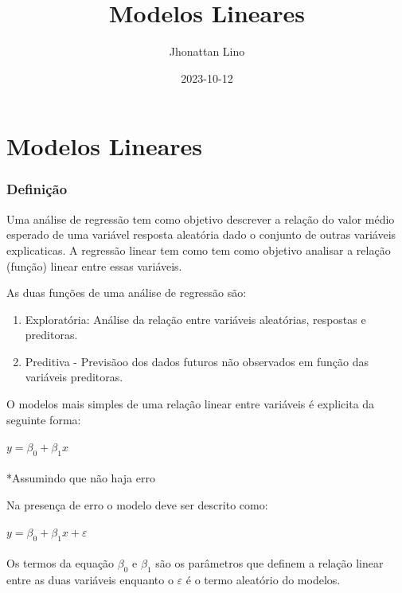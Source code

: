 \documentclass[
]{article}
\title{Modelos Lineares}
\author{Jhonattan Lino}
\date{2023-10-12}
\begin{document}
\maketitle

\hypertarget{modelos-lineares}{%
\section{Modelos Lineares}\label{modelos-lineares}}

\hypertarget{definiuxe7uxe3o}{%
\subsubsection{Definição}\label{definiuxe7uxe3o}}

Uma análise de regressão tem como objetivo descrever a relação do valor
médio esperado de uma variável resposta aleatória dado o conjunto de
outras variáveis explicaticas. A regressão linear tem como tem como
objetivo analisar a relação (função) linear entre essas variáveis.

As duas funções de uma análise de regressão são:

\begin{enumerate}
\def\labelenumi{\roman{enumi}.}
\item
  Exploratória: Análise da relação entre variáveis aleatórias, respostas
  e preditoras.
\item
  Preditiva - Previsãoo dos dados futuros não observados em função das
  variáveis preditoras.
\end{enumerate}

O modelos mais simples de uma relação linear entre variáveis é explicita
da seguinte forma:

\hypertarget{y-beta_0-beta_1x}{%
\paragraph{\texorpdfstring{\(y= \beta_0 + \beta_1x\)}{y= \textbackslash beta\_0 + \textbackslash beta\_1x}}\label{y-beta_0-beta_1x}}

*Assumindo que não haja erro

Na presença de erro o modelo deve ser descrito como:

\hypertarget{ybeta_0-beta_1x-varepsilon}{%
\paragraph{\texorpdfstring{\(y=\beta_0 + \beta_1x + \varepsilon\)}{y=\textbackslash beta\_0 + \textbackslash beta\_1x + \textbackslash varepsilon}}\label{ybeta_0-beta_1x-varepsilon}}

Os termos da equação \(\beta_0\) e \(\beta_1\) são os parâmetros que
definem a relação linear entre as duas variáveis enquanto o
\(\varepsilon\) é o termo aleatório do modelos.
\end{document}
